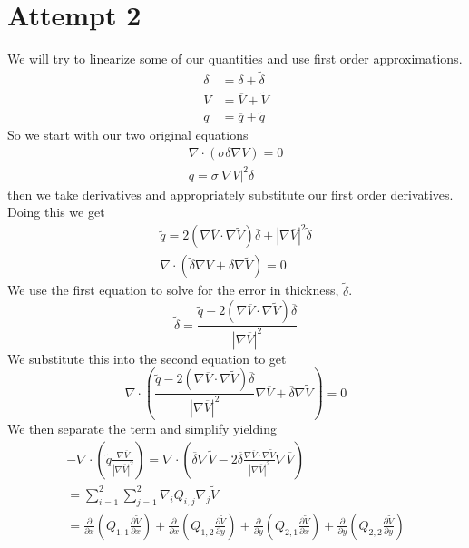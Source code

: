 \documentclass[12pt]{article}
\begin{document}
\section{Attempt 2}
We will try to linearize some of our quantities and use first order approximations.
\begin{align*}
\delta &= \overline{\delta} + \widetilde{\delta}\\
V &= \overline{V} + \widetilde{V} \\
q &= \overline{q} + \widetilde{q} 
\end{align*}
So we start with our two original equations
\begin{gather*}
\nabla \cdot (\sigma \delta \nabla V) = 0 \\
q = \sigma |\nabla V|^2 \delta
\end{gather*}
then we take derivatives and appropriately substitute our first order derivatives.
Doing this we get
\begin{gather*}
\widetilde{q} = 2(\nabla \overline{V} \cdot \nabla \widetilde{V}) \overline{\delta} + |\nabla \overline{V}|^2 \widetilde{\delta} \\
\nabla \cdot (\widetilde{\delta}\nabla \overline{V}+ \overline{\delta} \nabla \widetilde{V}) = 0
\end{gather*}
We use the first equation to solve for the error in thickness, $\widetilde{\delta}$.
\[
\widetilde{\delta} = \frac{\widetilde{q} - 2(\nabla \overline{V} \cdot \nabla \widetilde{V}) \overline{\delta}}{|\nabla \overline{V}|^2 }
\]
We substitute this into the second equation to get
\[
\nabla \cdot \left(\frac{\widetilde{q} - 2\left(\nabla \overline{V} \cdot \nabla \widetilde{V} \right) \overline{\delta}}{|\nabla \overline{V}|^2 }\nabla \overline{V}+ \overline{\delta} \nabla \widetilde{V}\right) = 0
\]
We then separate the term and simplify yielding
\begin{gather*}
-\nabla \cdot \left( \widetilde{q} \frac{\nabla \overline{V}}{|\nabla \overline{V}|^2}\right) 
=
\nabla \cdot \left(\overline{\delta}\nabla \widetilde{V} -2 \overline{\delta} \frac{\nabla \overline{V}\cdot \nabla \widetilde{V}}{|\nabla \overline{V}|^2}\nabla\overline{V} \right) \\
= \sum_{i=1}^2\sum_{j=1}^2 \nabla_i Q_{i,j} \nabla_j \widetilde{V} \\
= 
\frac{\partial}{\partial x}\left(Q_{1,1}\frac{\partial \widetilde{V}}{\partial x}\right) 
+
\frac{\partial}{\partial x}\left(Q_{1,2}\frac{\partial \widetilde{V}}{\partial y}\right)
+
\frac{\partial}{\partial y}\left(Q_{2,1}\frac{\partial \widetilde{V}}{\partial x}\right)
+
\frac{\partial}{\partial y}\left(Q_{2,2}\frac{\partial \widetilde{V}}{\partial y}\right)
\end{gather*}
\end{document}
